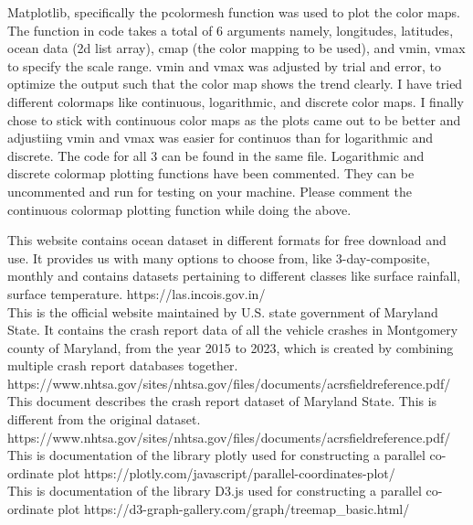\documentclass[conference]{IEEEtran}
\begin{document}
\begin{enumerate}
Matplotlib, specifically the pcolormesh function was used to plot the color maps. The function in code takes a total of 6 arguments namely, longitudes, latitudes, ocean data (2d list array), cmap (the color mapping to be used), and vmin, vmax to specify the scale range. vmin and vmax was adjusted by trial and error, to optimize the output such that the color map shows the trend clearly. I have tried different colormaps like continuous, logarithmic, and discrete color maps. I finally chose to stick with continuous color maps as the plots came out to be better and adjustiing vmin and vmax was easier for continuos than for logarithmic and discrete. The code for all 3 can be found in the same file. Logarithmic and discrete colormap plotting functions have been commented. They can be uncommented and run for testing on your machine. Please comment the continuous colormap plotting function while doing the above.    
\end{enumerate}


\begin{thebibliography}{00}

 This website contains ocean dataset in different formats for free download and use. It provides us with many options to choose from, like 3-day-composite, monthly and contains datasets pertaining to different classes like surface rainfall, surface temperature.
https://las.incois.gov.in/ \\

 This is the official website maintained by U.S. state government of Maryland State. It contains the crash report data of all the vehicle crashes in Montgomery county of Maryland, from the year 2015 to 2023, which is created by combining multiple crash report databases together.
https://www.nhtsa.gov/sites/nhtsa.gov/files/documents/acrsfieldreference.pdf/ \\

 This document describes the crash report dataset of Maryland State. This is different from the original dataset.
https://www.nhtsa.gov/sites/nhtsa.gov/files/documents/acrsfieldreference.pdf/ \\

 This is documentation of the library plotly used for constructing a parallel co-ordinate plot 
https://plotly.com/javascript/parallel-coordinates-plot/ \\

 This is documentation of the library D3.js used for constructing a parallel co-ordinate plot 
https://d3-graph-gallery.com/graph/treemap_basic.html/ \\

\end{thebibliography}
\end{document}
